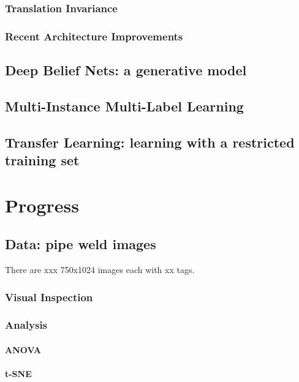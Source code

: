 \documentclass[a4paper,11pt]{article}
\begin{document}
\subsubsection{Translation Invariance}

\subsubsection{Recent Architecture Improvements}

\pagebreak
\subsection{Deep Belief Nets: a generative model}


\subsection{Multi-Instance Multi-Label Learning}

\subsection{Transfer Learning: learning with a restricted training set}



\clearpage
\section{Progress}

\subsection{Data: pipe weld images}
There are xxx 750x1024 images each with xx tags.

\subsubsection{Visual Inspection}
\subsubsection{Analysis}
\paragraph{ANOVA}
\paragraph{t-SNE}
\end{document}
